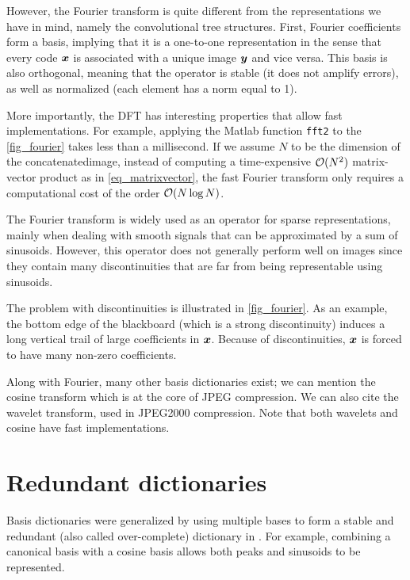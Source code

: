 \noindent
However, the Fourier transform is quite different from the representations we have in mind, namely the convolutional tree structures. First, Fourier coefficients form a basis, implying that it is a one-to-one representation in the sense that every code $\bm{x}$ is associated with a unique image $\bm{y}$ and vice versa. This basis is also orthogonal, meaning that the operator is stable (it does not amplify errors), as well as normalized (each element has a norm equal to 1).

\noindent
More importantly, the \ac{DFT} has interesting properties that allow fast implementations. For example, applying the Matlab function \texttt{fft2} to the \cref{fig_fourier} takes less than a millisecond. If we assume $N$ to be the dimension of the concatenated\footnotemark[2] image, instead of computing a time-expensive $\mathcal{O}(N^2)$ matrix-vector product as in \eqref{eq_matrixvector}, the fast Fourier transform only requires a computational cost of the order $\mathcal{O}(N \log N)$.


\noindent
The Fourier transform is widely used as an operator for sparse representations, mainly when dealing with smooth signals that can be approximated by a sum of sinusoids. However, this operator does not generally perform well on images since they contain many discontinuities that are far from being representable using sinusoids.

\noindent
The problem with discontinuities is illustrated in \cref{fig_fourier}. As an example, the bottom edge of the blackboard (which is a strong discontinuity) induces a long vertical trail of large coefficients in $\bm{x}$. Because of discontinuities, $\bm{x}$ is forced to have many non-zero coefficients. 

\noindent
Along with Fourier, many other basis dictionaries exist; we can mention the cosine transform which is at the core of JPEG compression. We can also cite the wavelet transform, used in JPEG2000 compression. Note that both wavelets and cosine have fast implementations.

\section{Redundant dictionaries}

Basis dictionaries were generalized by using multiple bases to form a stable and redundant (also called over-complete) dictionary in \cite{shaobing_chen_atomic_2001}. For example, combining a canonical basis with a cosine basis allows both peaks and sinusoids to be represented.

